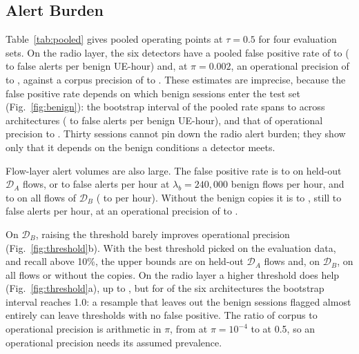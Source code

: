 \documentclass{ieeeaccess}
\newcommand{\DA}{\ensuremath{\mathcal{D}_{A}}}
\newcommand{\DB}{\ensuremath{\mathcal{D}_{B}}}
\begin{document}
\subsection{Alert Burden}
\label{sec:res:alerts}

Table~\ref{tab:pooled} gives pooled operating points at $\tau=0.5$ for four evaluation sets. On the radio layer, the six detectors have a pooled false positive rate of \RadFPRmin{} to \RadFPRmax{} (\RadFAmin{} to \RadFAmax{} false alerts per benign UE-hour) and, at $\pi=0.002$, an operational precision of \RadPPVmin{} to \RadPPVmax{}, against a corpus precision of \RadPrecMin{} to \RadPrecMax{}. These estimates are imprecise, because the false positive rate depends on which benign sessions enter the test set (Fig.~\ref{fig:benign}): the bootstrap interval of the pooled rate spans \RadCbFPRlo{} to \RadCbFPRhi{} across architectures (\RadCbFAlo{} to \RadCbFAhi{} false alerts per benign UE-hour), and that of operational precision \RadCbPPVlo{} to \RadCbPPVhi{}. Thirty sessions cannot pin down the radio alert burden; they show only that it depends on the benign conditions a detector meets.

Flow-layer alert volumes are also large. The false positive rate is \NetSrcFPRmin{} to \NetSrcFPRmax{} on held-out \DA{} flows, or \NetSrcFAmin{} to \NetSrcFAmax{} false alerts per hour at $\lambda_b = 240{,}000$ benign flows per hour, and \NetTgtFPRmin{} to \NetTgtFPRmax{} on all flows of \DB{} (\NetTgtFAmin{} to \NetTgtFAmax{} per hour). Without the benign copies it is \NetCleanFPRmin{} to \NetCleanFPRmax{}, still \NetCleanFAmin{} to \NetCleanFAmax{} false alerts per hour, at an operational precision of \NetCleanPPVmin{} to \NetCleanPPVmax{}.

On \DB{}, raising the threshold barely improves operational precision (Fig.~\ref{fig:threshold}b). With the best threshold picked on the evaluation data, and recall above 10\%, the upper bounds are \NetSrcPPVbest{} on held-out \DA{} flows and, on \DB{}, \NetTgtPPVbest{} on all flows or \NetCleanPPVbest{} without the copies. On the radio layer a higher threshold does help (Fig.~\ref{fig:threshold}a), up to \RadPPVbest{}, but for \RadCbBestHiN{} of the six architectures the bootstrap interval reaches 1.0: a resample that leaves out the benign sessions flagged almost entirely can leave thresholds with no false positive. The ratio of corpus to operational precision is arithmetic in $\pi$, from \RadCollapseLowPi{} at $\pi = 10^{-4}$ to \RadCollapseHighPi{} at 0.5, so an operational precision needs its assumed prevalence.
\end{document}
